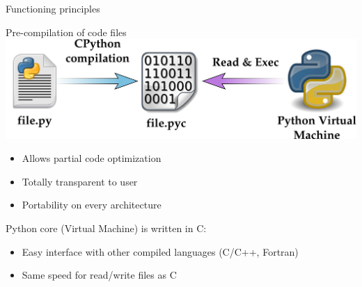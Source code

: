 \documentclass[11pt,unknownkeysallowed,usenames,dvipsnames]{beamer}
\begin{document}
	\begin{frame}{Functioning principles}
        \begin{block}{Pre-compilation of code files}
            \centering
            \includegraphics[width=0.8\linewidth]{cpython}
            
            \vspace*{-20pt}   
            \begin{itemize}
                \item Allows partial code optimization
                \item Totally transparent to user
                \item Portability on every architecture
            \end{itemize}
        \end{block}
        Python core (Virtual Machine) is written in C:
        
        \vspace*{-5pt}
        \begin{itemize}
            \item Easy interface with other compiled languages (C/C++, Fortran)
            \item Same speed for read/write files as C
        \end{itemize}
        
        \vspace*{-20pt}
    \end{frame}
\end{document}
